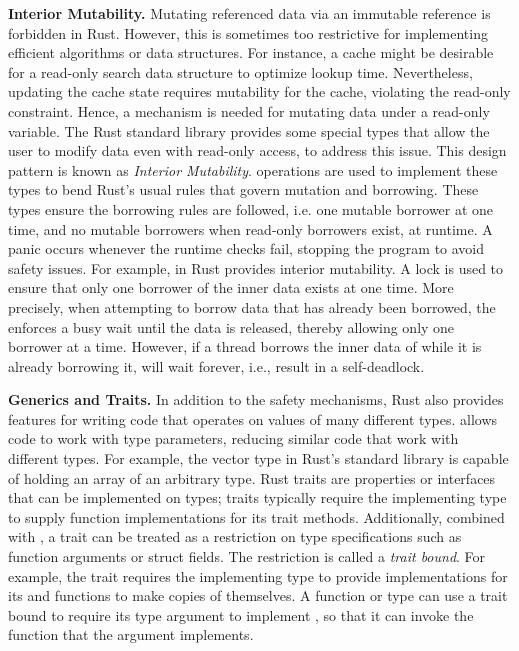 \textbf{Interior Mutability.}
Mutating referenced data via an immutable reference is forbidden in Rust.
However, this is sometimes too restrictive for implementing efficient
algorithms or data structures.
For instance, a cache might be desirable for a read-only search data structure
to optimize lookup time. Nevertheless, updating the cache state requires
mutability for the cache, violating the read-only constraint.
Hence, a mechanism is needed for mutating data under a read-only variable.
The Rust standard library provides some special types that allow the user to
modify data even with read-only access, to address this issue.
This design pattern is known as \textit{Interior Mutability}.
 operations are used to implement these types to bend Rust's usual
rules that govern mutation and borrowing.
These types ensure the borrowing rules are followed, i.e. one mutable borrower
at one time, and no mutable borrowers when read-only borrowers exist, at
runtime. A panic occurs whenever the runtime checks fail, stopping the program
to avoid safety issues. For example,  in Rust provides interior
mutability. A lock is used to ensure that only one borrower of the inner data
exists at one time.
More precisely, when attempting to borrow data that has already been borrowed,
the  enforces a busy wait until the data is released, thereby
allowing only one borrower at a time.
However, if a thread borrows the inner data of  while it is already
borrowing it,  will wait forever, i.e., result in a self-deadlock.

\textbf{Generics and Traits.}
In addition to the safety mechanisms, Rust also provides features for writing
code that operates on values of many different types.  allows
code to work with type parameters, reducing similar code that work with
different types.
For example, the vector type in Rust's standard library 
is capable of holding an array of an arbitrary type.
Rust traits are properties or interfaces that can be implemented on types;
traits typically require the implementing type to supply function
implementations for its trait methods.
Additionally, combined with , a trait can be treated as a
restriction on type specifications such as function arguments or struct fields.
The restriction is called a \textit{trait bound}.
For example, the  trait requires the implementing type
to provide implementations for its  and  functions
to make copies of themselves.
A  function or type can use a trait bound to
require its type argument to implement ,
so that it can invoke the  function that the argument implements.

